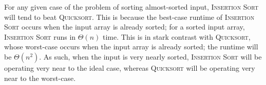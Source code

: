 For any given case of the problem of sorting almost-sorted input, \textsc{Insertion Sort} will tend to beat \textsc{Quicksort}. This is because the best-case runtime of \textsc{Insertion Sort} occurs when the input array is already sorted; for a sorted input array, \textsc{Insertion Sort} runs in $ \Theta(n) $ time. This is in stark contrast with \textsc{Quicksort}, whose worst-case occurs when the input array is already sorted; the runtime will be $ \Theta(n^2) $. As such, when the input is very nearly sorted, \textsc{Insertion Sort} will be operating very near to the ideal case, whereas \textsc{Quicksort} will be operating very near to the worst-case.